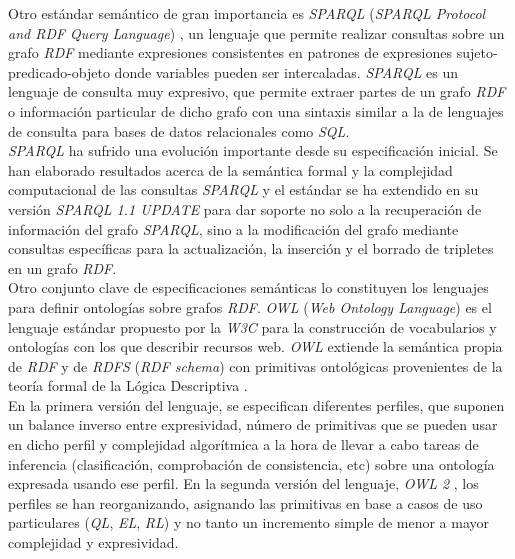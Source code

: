 Otro est\'andar sem\'antico de gran importancia es \textit{SPARQL} (\textit{SPARQL Protocol and RDF Query Language}) \cite{sparql}, un lenguaje que permite realizar consultas sobre un grafo \textit{RDF} mediante expresiones consistentes en patrones de expresiones sujeto-predicado-objeto donde variables pueden ser intercaladas. \textit{SPARQL} es un lenguaje de consulta muy expresivo, que permite extraer partes de un grafo \textit{RDF} o informaci\'on particular de dicho grafo con una sintaxis similar a la de lenguajes de consulta para bases de datos relacionales como \textit{SQL}.\\
\textit{SPARQL} ha sufrido una evoluci\'on importante desde su especificaci\'on inicial. Se han elaborado resultados acerca de la sem\'antica formal y la complejidad computacional de las consultas \textit{SPARQL} \cite{perez2006semantics} y el est\'andar se ha extendido en su versi\'on \textit{SPARQL 1.1 UPDATE} \cite{sparql11} para dar soporte no solo a la recuperaci\'on de informaci\'on del grafo \textit{SPARQL}, sino a la modificaci\'on del grafo mediante consultas espec\'ificas para la actualizaci\'on, la inserci\'on y el borrado de tripletes en un grafo \textit{RDF}.\\

Otro conjunto clave de especificaciones sem\'anticas lo constituyen los lenguajes para definir ontolog\'ias sobre grafos \textit{RDF}. \textit{OWL} (\textit{Web Ontology Language}) \cite{owl} es el lenguaje est\'andar propuesto por la \textit{W3C} para la construcci\'on de vocabularios y ontolog\'ias con los que describir recursos web. \textit{OWL} extiende la sem\'antica propia de \textit{RDF} y de \textit{RDFS} (\textit{RDF schema}) \cite{rdfs} con primitivas ontol\'ogicas provenientes de la teor\'ia formal de la L\'ogica Descriptiva \cite{owl_dl_reduction}.\\
En la primera versi\'on del lenguaje, se especifican diferentes perfiles, que suponen un balance inverso entre expresividad, n\'umero de primitivas que se pueden usar en dicho perfil y complejidad algor\'itmica a la hora de llevar a cabo tareas de inferencia (clasificaci\'on, comprobaci\'on de consistencia, etc) sobre una ontolog\'ia expresada usando ese perfil. En la segunda versi\'on del lenguaje, \textit{OWL 2} \cite{owl2}, los perfiles se han reorganizando, asignando las primitivas en base a casos de uso particulares (\textit{QL}, \textit{EL}, \textit{RL}) \cite{owl2_profiles} y no tanto un incremento simple de menor a mayor complejidad y expresividad.
